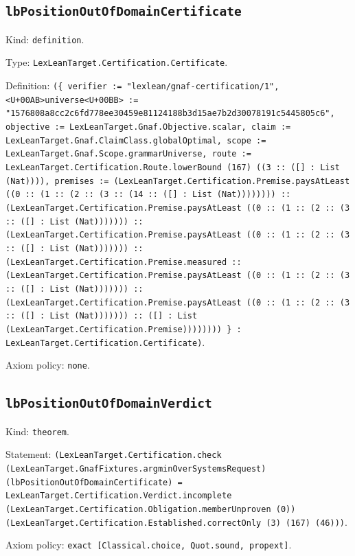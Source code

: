 \documentclass[11pt]{article}
\begin{document}
\subsection*{\texttt{lbPositionOutOfDomainCertificate}}
\noindent Kind: \texttt{definition}.\par
\noindent Type: \texttt{LexLeanTarget.Certification.Certificate}.\par
\noindent Definition: \texttt{(\{ verifier := "lexlean/gnaf-certification/1", <U+00AB>universe<U+00BB> := "1576808a8cc2c6fd778ee30459e81124188b3d15ae7b2d30078191c5445805c6", objective := LexLeanTarget.Gnaf.Objective.scalar, claim := LexLeanTarget.Gnaf.ClaimClass.globalOptimal, scope := LexLeanTarget.Gnaf.Scope.grammarUniverse, route := LexLeanTarget.Certification.Route.lowerBound (167) ((3 :: ([] : List (Nat)))), premises := (LexLeanTarget.Certification.Premise.paysAtLeast ((0 :: (1 :: (2 :: (3 :: (14 :: ([] : List (Nat)))))))) :: (LexLeanTarget.Certification.Premise.paysAtLeast ((0 :: (1 :: (2 :: (3 :: ([] : List (Nat))))))) :: (LexLeanTarget.Certification.Premise.paysAtLeast ((0 :: (1 :: (2 :: (3 :: ([] : List (Nat))))))) :: (LexLeanTarget.Certification.Premise.measured :: (LexLeanTarget.Certification.Premise.paysAtLeast ((0 :: (1 :: (2 :: (3 :: ([] : List (Nat))))))) :: (LexLeanTarget.Certification.Premise.paysAtLeast ((0 :: (1 :: (2 :: (3 :: ([] : List (Nat))))))) :: ([] : List (LexLeanTarget.Certification.Premise)))))))) \} : LexLeanTarget.Certification.Certificate)}.\par
\noindent Axiom policy: \texttt{none}.\par
\subsection*{\texttt{lbPositionOutOfDomainVerdict}}
\noindent Kind: \texttt{theorem}.\par
\noindent Statement: \texttt{(LexLeanTarget.Certification.check (LexLeanTarget.GnafFixtures.argminOverSystemsRequest) (lbPositionOutOfDomainCertificate) = LexLeanTarget.Certification.Verdict.incomplete (LexLeanTarget.Certification.Obligation.memberUnproven (0)) (LexLeanTarget.Certification.Established.correctOnly (3) (167) (46)))}.\par
\noindent Axiom policy: \texttt{exact [Classical.choice, Quot.sound, propext]}.\par
\end{document}
